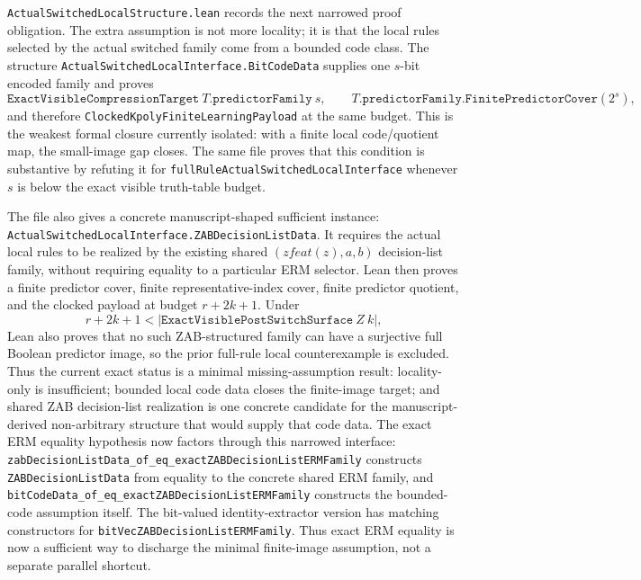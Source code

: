 \documentclass[11pt]{article}
\theoremstyle{remark}
\begin{document}
\texttt{ActualSwitchedLocalStructure.lean} records the next narrowed proof
obligation.  The extra assumption is not more locality; it is that the local
rules selected by the actual switched family come from a bounded code class.
The structure \texttt{ActualSwitchedLocalInterface.BitCodeData} supplies one
\(s\)-bit encoded family and proves
\[
  \texttt{ExactVisibleCompressionTarget}\ T.\texttt{predictorFamily}\ s,
  \qquad
  T.\texttt{predictorFamily.FinitePredictorCover}(2^s),
\]
and therefore \texttt{ClockedKpolyFiniteLearningPayload} at the same budget.
This is the weakest formal closure currently isolated: with a finite local
code/quotient map, the small-image gap closes.  The same file proves that this
condition is substantive by refuting it for
\texttt{fullRuleActualSwitchedLocalInterface} whenever
\(s\) is below the exact visible truth-table budget.

The file also gives a concrete manuscript-shaped sufficient instance:
\texttt{ActualSwitchedLocalInterface.ZABDecisionListData}.  It requires the
actual local rules to be realized by the existing shared
\((zfeat(z),a,b)\) decision-list family, without requiring equality to a
particular ERM selector.  Lean then proves a finite predictor cover, finite
representative-index cover, finite predictor quotient, and the clocked payload
at budget \(r+2k+1\).  Under
\[
  r+2k+1 < |\texttt{ExactVisiblePostSwitchSurface}\ Z\ k|,
\]
Lean also proves that no such ZAB-structured family can have a surjective
full Boolean predictor image, so the prior full-rule local counterexample is
excluded.  Thus the current exact status is a minimal missing-assumption
result: locality-only is insufficient; bounded local code data closes the
finite-image target; and shared ZAB decision-list realization is one concrete
candidate for the manuscript-derived non-arbitrary structure that would supply
that code data.
The exact ERM equality hypothesis now factors through this narrowed interface:
\texttt{zabDecisionListData\_of\_eq\_exactZABDecisionListERMFamily} constructs
\texttt{ZABDecisionListData} from equality to the concrete shared ERM family,
and
\texttt{bitCodeData\_of\_eq\_exactZABDecisionListERMFamily} constructs the
bounded-code assumption itself.  The bit-valued identity-extractor version has
matching constructors for
\texttt{bitVecZABDecisionListERMFamily}.  Thus exact ERM equality is now a
sufficient way to discharge the minimal finite-image assumption, not a separate
parallel shortcut.
\end{document}

